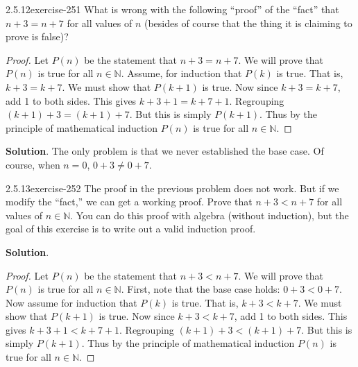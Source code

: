 \documentclass[twoside,11pt,]{book}
\numberwithin{equation}{chapter}
\newcommand{\N}{\mathbb N}
\newcommand{\lt}{<}
\begin{document}
\begin{divisionsolution}{2.5.12}{}{exercise-251}%
\hypertarget{p-3637}{}%
What is wrong with the following ``proof'' of the ``fact'' that \(n+3 = n+7\) for all values of \(n\) (besides of course that the thing it is claiming to prove is false)?%
\begin{proof}{}
\hypertarget{p-3638}{}%
Let \(P(n)\) be the statement that \(n + 3 = n + 7\). We will prove that \(P(n)\) is true for all \(n \in \N\). Assume, for induction that \(P(k)\) is true. That is, \(k+3 = k+7\). We must show that \(P(k+1)\) is true. Now since \(k + 3 = k + 7\), add 1 to both sides. This gives \(k + 3 + 1 = k + 7 + 1\). Regrouping \((k+1) + 3 = (k+1) + 7\). But this is simply \(P(k+1)\). Thus by the principle of mathematical induction \(P(n)\) is true for all \(n \in \N\).%
\end{proof}
\par\smallskip%
\noindent\textbf{Solution}.\quad%
\hypertarget{p-3639}{}%
The only problem is that we never established the base case. Of course, when \(n = 0\), \(0+3 \ne 0+7\).%
\end{divisionsolution}%
\begin{divisionsolution}{2.5.13}{}{exercise-252}%
\hypertarget{p-3640}{}%
The proof in the previous problem does not work. But if we modify the ``fact,'' we can get a working proof. Prove that \(n + 3 \lt n + 7\) for all values of \(n \in \N\). You can do this proof with algebra (without induction), but the goal of this exercise is to write out a valid induction proof.%
\par\smallskip%
\noindent\textbf{Solution}.\quad%
\begin{proof}{}
\hypertarget{p-3641}{}%
Let \(P(n)\) be the statement that \(n + 3 \lt n + 7\). We will prove that \(P(n)\) is true for all \(n \in \N\). First, note that the base case holds: \(0+3 \lt 0+7\). Now assume for induction that \(P(k)\) is true. That is, \(k+3 \lt k+7\). We must show that \(P(k+1)\) is true. Now since \(k + 3 \lt k + 7\), add 1 to both sides. This gives \(k + 3 + 1 \lt k + 7 + 1\). Regrouping \((k+1) + 3 \lt (k+1) + 7\). But this is simply \(P(k+1)\). Thus by the principle of mathematical induction \(P(n)\) is true for all \(n \in \N\).%
\end{proof}
\end{divisionsolution}%
\end{document}

